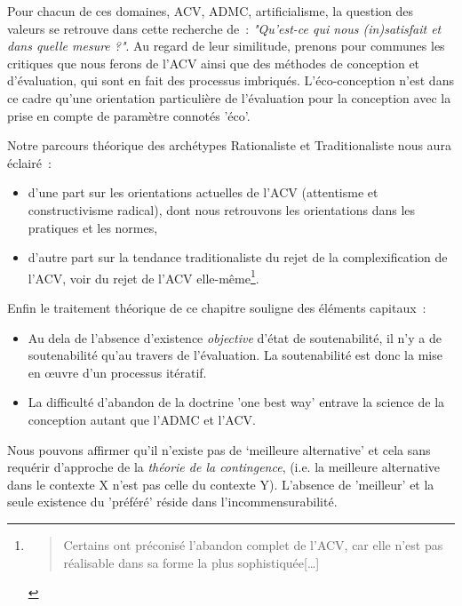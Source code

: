 Pour chacun de ces domaines, \gls{ACV}, \gls{ADMC}, artificialisme, la question des valeurs se retrouve dans cette recherche de~: \textit{"Qu'est-ce qui nous (in)satisfait et dans quelle mesure ?"}.
Au regard de leur similitude, prenons pour communes les critiques que nous ferons de l'\gls{ACV} ainsi que des méthodes de conception et d'évaluation, qui sont en fait des processus imbriqués.
L'éco-conception n'est dans ce cadre qu'une orientation particulière de l'évaluation pour la conception avec la prise en compte de paramètre connotés 'éco'.

Notre parcours théorique des archétypes Rationaliste et Traditionaliste nous aura éclairé~:
\begin{itemize}
\item d'une part sur les orientations actuelles de l'ACV (attentisme et constructivisme radical), dont nous retrouvons les orientations dans les pratiques et les normes,
\item d'autre part sur la tendance traditionaliste du rejet de la complexification de l'\gls{ACV}, voir du rejet de l'\gls{ACV} elle-même\footnote{
\blockcquote{bare_life_1999}{
Certains ont préconisé l'abandon complet de l'ACV, car elle n'est pas réalisable dans sa forme la plus sophistiquée[\ldots]
}
}.
\end{itemize}

Enfin le traitement théorique de ce chapitre souligne des éléments capitaux~:
\begin{itemize}
\item Au dela de l'absence d’existence \textit{objective} d'état de soutenabilité, il n'y a de soutenabilité qu'au travers de l'évaluation.
La soutenabilité est donc la mise en œuvre d'un processus itératif.
\item La difficulté d'abandon de la doctrine 'one best way' entrave la science de la conception autant que l'\gls{ADMC} et l'\gls{ACV}.
\end{itemize}
Nous pouvons affirmer qu'il n'existe pas de `meilleure alternative' et cela sans requérir d'approche de la \textit{théorie de la contingence}, (i.e. la meilleure alternative dans le contexte X n'est pas celle du contexte Y).
L'absence de 'meilleur' et la seule existence du 'préféré' réside dans l'incommensurabilité.
